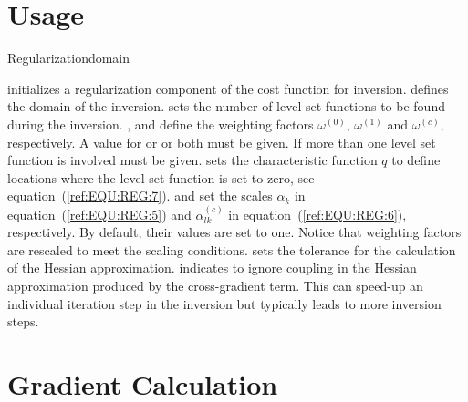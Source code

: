 \section{Usage}

\begin{classdesc}{Regularization}{domain
        }

  
initializes a regularization component of the cost function for inversion. 
 defines the domain of the inversion. 
sets the number of level set functions to be found during the inversion. 
,  and   define the weighting factors
$\omega^{(0)}$,
$\omega^{(1)}$ and
$\omega^{(c)}$, respectively. A value for  or  or both must be given. 
If more than one level set function is involved   must be given. 
 sets the characteristic function $q$ 
to define locations where the level set function is set to zero, see equation~(\ref{ref:EQU:REG:7}).
 and 
 set the scales $\alpha_k$ in equation~(\ref{ref:EQU:REG:5}) and
$\alpha^{(c)}_{lk}$ in equation~(\ref{ref:EQU:REG:6}), respectively. By default, their values are set to one.
Notice that weighting factors are rescaled to meet the scaling conditions.  sets the 
tolerance for the calculation of the Hessian approximation.  
indicates to ignore coupling in the Hessian approximation produced by the 
cross-gradient term. This can speed-up an individual iteration step in the inversion but typically leads to more
inversion steps.
\end{classdesc}

\section{Gradient Calculation}


